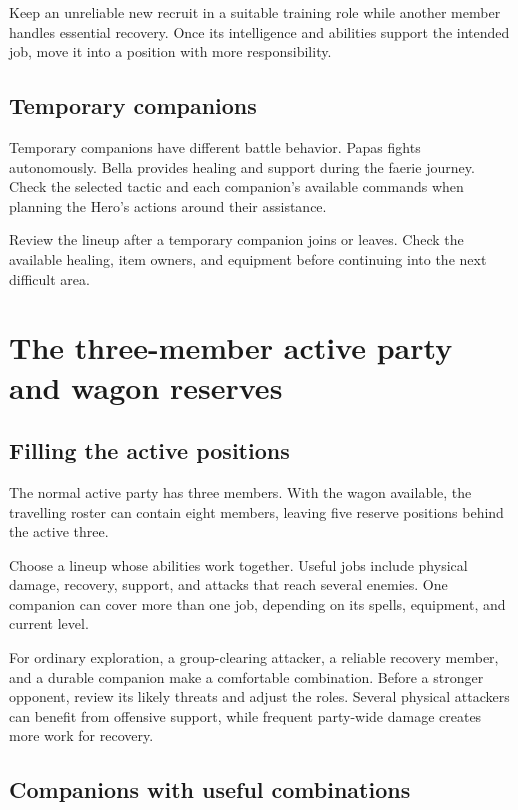 Keep an unreliable new recruit in a suitable training role while another
member handles essential recovery. Once its intelligence and abilities
support the intended job, move it into a position with more responsibility.

\subsection*{Temporary companions}

Temporary companions have different battle behavior. Papas fights
autonomously. Bella provides healing and support during the faerie
journey. Check the selected tactic and each companion's available
commands when planning the Hero's actions around their assistance.

Review the lineup after a temporary companion joins or leaves. Check
the available healing, item owners, and equipment before continuing into
the next difficult area.

\section{The three-member active party and wagon reserves}

\subsection*{Filling the active positions}

The normal active party has three members. With the wagon available,
the travelling roster can contain eight members, leaving five reserve
positions behind the active three.

Choose a lineup whose abilities work together. Useful jobs include
physical damage, recovery, support, and attacks that reach several enemies.
One companion can cover more than one job, depending on its spells,
equipment, and current level.

For ordinary exploration, a group-clearing attacker, a reliable recovery
member, and a durable companion make a comfortable combination. Before
a stronger opponent, review its likely threats and adjust the roles.
Several physical attackers can benefit from offensive support, while
frequent party-wide damage creates more work for recovery.

\subsection*{Companions with useful combinations}

